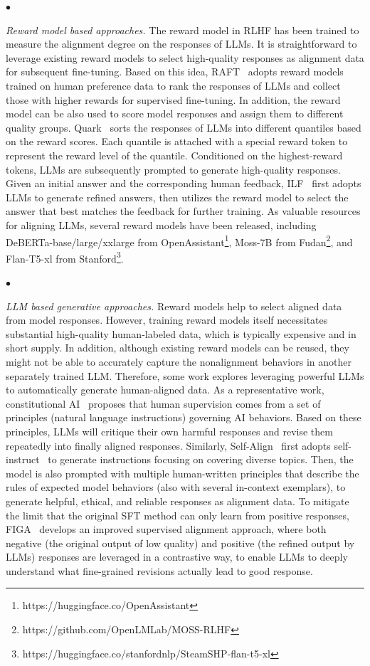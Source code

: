 $\bullet$  {\textit{Reward model based approaches.} The reward model in RLHF has been trained to measure the alignment degree on {the responses of LLMs}. It is straightforward to leverage existing reward models to select high-quality responses as alignment data for subsequent fine-tuning. Based on this idea, RAFT~\cite{Dong-RAFT-2023-arxiv} adopts reward models trained on human preference data to rank the responses of LLMs and collect those with higher rewards for supervised fine-tuning. 
In addition, the reward model can be also used to score model responses and assign them to different quality groups. Quark~\cite{Lu-nips-2022-quark} sorts the responses of LLMs into different quantiles based on the reward scores. Each quantile is attached with a special reward token to represent the reward level of the quantile. Conditioned on the highest-reward tokens, LLMs are subsequently prompted to generate high-quality responses. {Given an initial answer and the corresponding human feedback, ILF~\cite{Scheurer-arxiv-2023-ILF} first adopts LLMs to generate refined answers, then utilizes the reward model to select the answer that best matches the feedback for further training.}
As valuable resources for aligning LLMs, several reward models have been released, including DeBERTa-base/large/xxlarge from OpenAssistant\footnote{https://huggingface.co/OpenAssistant}, Moss-7B from Fudan\footnote{https://github.com/OpenLMLab/MOSS-RLHF}, and Flan-T5-xl from Stanford\footnote{https://huggingface.co/stanfordnlp/SteamSHP-flan-t5-xl}.



$\bullet$ {\textit{LLM based generative approaches.} Reward models help to select aligned data from model responses. However, training reward models itself necessitates substantial high-quality human-labeled data, which is typically expensive and in short supply. 
In addition, although existing reward models can be reused, they might not be able to accurately capture the nonalignment behaviors in another separately trained LLM.   
Therefore, some work explores leveraging powerful LLMs to automatically generate human-aligned data. As a representative work, constitutional AI~\cite{Bai-arXiv-2022-Constitutional} proposes  that human supervision comes from a set of principles (\ie natural language instructions) governing AI behaviors. Based on these principles, LLMs will critique their own harmful responses and revise them repeatedly into finally aligned responses. Similarly, Self-Align~\cite{Sun-arxiv-2023-Principle} first adopts self-instruct~\cite{Wang-arXiv-2022-Self} to generate instructions focusing on covering diverse topics. Then, the model is also prompted with multiple human-written principles that describe the rules of expected model behaviors (also with several in-context exemplars), to generate helpful, ethical, and reliable responses as alignment data. 
{To mitigate the limit that the original SFT method can only learn from positive responses, 
FIGA~\cite{Guo-arxiv-2023-Beyond} develops an improved supervised alignment approach, where both  negative (the original output of low quality) and positive (the refined output by LLMs) responses are leveraged in a contrastive way, to enable LLMs to deeply understand what fine-grained revisions actually  lead to good response. 
}


}}
